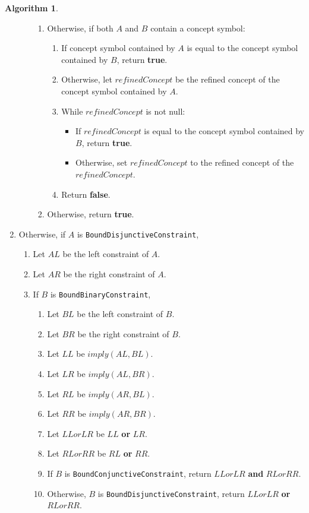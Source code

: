 \documentclass[a4paper,oneside,11pt]{book}
\theoremstyle{definition}
\newtheorem{algo}{Algorithm}[section]
\begin{document}
\begin{algo}
\begin{enumerate}
\begin{enumerate}
\begin{enumerate}
\item
Otherwise, if both $A$ and $B$ contain a concept symbol:
\begin{enumerate}
\item
If concept symbol contained by $A$ is equal to the concept symbol contained by $B$, return \textbf{true}.
\item
Otherwise, let $refinedConcept$ be the refined concept of the concept symbol contained by $A$.
\item
While $refinedConcept$ is not null:
\begin{itemize}
\item
If $refinedConcept$ is equal to the concept symbol contained by $B$, return \textbf{true}.
\item
Otherwise, set $refinedConcept$ to the refined concept of the $refinedConcept$.
\end{itemize}
\item
Return \textbf{false}.
\end{enumerate}
\item
Otherwise, return \textbf{true}.
\end{enumerate}
\end{enumerate}
\item
Otherwise, if $A$ is \verb|BoundDisjunctiveConstraint|,
\begin{enumerate}
\item
Let $AL$ be the left constraint of $A$.
\item
Let $AR$ be the right constraint of $A$.
\item
If $B$ is \verb|BoundBinaryConstraint|,
\begin{enumerate}
\item
Let $BL$ be the left constraint of $B$.
\item
Let $BR$ be the right constraint of $B$.
\item
Let $LL$ be $imply(AL, BL)$.
\item
Let $LR$ be $imply(AL, BR)$.
\item
Let $RL$ be $imply(AR, BL)$.
\item
Let $RR$ be $imply(AR, BR)$.
\item
Let $LLorLR$ be $LL$ \textbf{or} $LR$.
\item
Let $RLorRR$ be $RL$ \textbf{or} $RR$.
\item
If $B$ is \verb|BoundConjunctiveConstraint|, return $LLorLR$ \textbf{and} $RLorRR$.
\item
Otherwise, $B$ is \verb|BoundDisjunctiveConstraint|, return $LLorLR$ \textbf{or} $RLorRR$.

\end{enumerate}
\end{enumerate}
\end{enumerate}
\end{algo}
\end{document}
